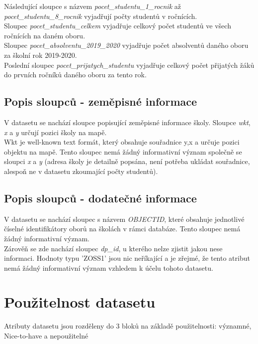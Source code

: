 \documentclass[12pt, a4paper]{article}
\begin{document}
Následující sloupce s názvem \textit{pocet\_studentu\_1\_rocnik} až \textit{pocet\_studentu\_8\_rocnik} vyjadřují počty studentů v ročnících. \\

Sloupec \textit{pocet\_studentu\_celkem} vyjadřuje celkový počet studentů ve všech ročnících na daném oboru. \\

Sloupec \textit{pocet\_absolventu\_2019\_2020} vyjadřuje počet absolventů daného oboru za školní rok 2019-2020. \\

Poslední sloupec \textit{pocet\_prijatych\_studentu} vyjadřuje celkový počet přijatých žáků do prvních ročníků daného oboru za tento rok. \\


\subsection{Popis sloupců - zeměpisné informace}
V datasetu se nachází sloupce popisující zeměpisné informace školy. Sloupce \textit{wkt}, \textit{x} a \textit{y} určují pozici školy na mapě.\\
Wkt je well-known text formát, který obsahuje souřadnice y,x a určuje pozici objektu na mapě. Tento sloupec nemá žádný informativní význam společně se sloupci \textit{x} a \textit{y} (adresa školy je detailně popsána, není potřeba ukládat souřadnice, alespoň ne v datasetu zkoumající počty studentů).


\subsection{Popis sloupců - dodatečné informace}
V datasetu se nachází sloupec s názvem \textit{OBJECTID}, které obsahuje jednotlivé číselné identifikátory oborů na školách v rámci databáze. Tento sloupec nemá žádný informativní význam.\\
Zárověň se zde nachází sloupec \textit{dp\_id}, u kterého nelze zjistit jakou nese informaci. Hodnoty typu 'ZOSS1' jsou nic neříkající a je zřejmé, že tento atribut nemá žádný informativní význam vzhledem k účelu tohoto datasetu. 



\newpage

\section{Použitelnost datasetu}
\noindent Atributy datasetu jsou rozděleny do 3 bloků na základě použitelnosti: významné, Nice-to-have a nepoužitelné\\
\end{document}
